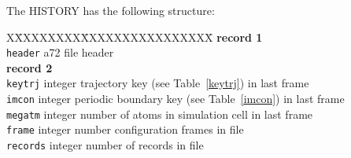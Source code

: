 The HISTORY has the following structure:
\begin{tabbing}
X\=XXXXXXXX\=XXXXXXXXXXXXXXXX\=\kill
{\bf record 1} \\
\> {\tt header}  \> a72     \> file header \\
{\bf record 2} \\
\> {\tt keytrj}  \> integer \> trajectory key (see Table~\ref{keytrj}) in last frame \\
\> {\tt imcon}   \> integer \> periodic boundary key (see Table~\ref{imcon}) in last frame \\
\> {\tt megatm}  \> integer \> number of atoms in simulation cell in last frame \\
\> {\tt frame}   \> integer \> number configuration frames in file \\
\> {\tt records} \> integer \> number of records in file
\end{tabbing}

